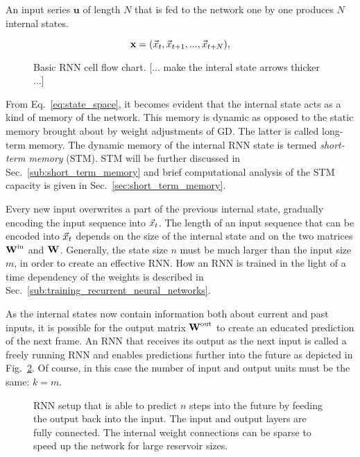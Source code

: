 An input series $\mathbf{u}$ of length $N$ that is fed to the network one by
one produces $N$ internal states.

\begin{equation}
  \mathbf{x} = (\vec{x}_t, \vec{x}_{t+1}, ..., \vec{x}_{t+N}),
\end{equation}
\begin{figure}
  \centering
  \RNNFlowChart
  \caption{Basic RNN cell flow chart. [... make the interal state arrows thicker ...]}
  \label{fig:rnn_flow_chart}
\end{figure}



From Eq.~\ref{eq:state_space}, it becomes evident that the internal state acts
as a kind of memory of the network.  This memory is dynamic as opposed to the
static memory brought about by weight adjustments of GD.  The latter is called
long-term memory. The dynamic memory of the internal RNN state is termed
\emph{short-term memory} (STM). STM will be further discussed in
Sec.~\ref{sub:short_term_memory}  and brief computational analysis of the STM
capacity is given in Sec.~\ref{sec:short_term_memory}. 

Every new input overwrites a part of the previous internal state, gradually
encoding the input sequence into $\vec{x}_t$.  The length of an input sequence
that can be encoded into $\vec{x}_t$ depends on the size of the internal state and
on the two matrices $\boldsymbol{\textbf{W}}^{\text{in}}$ and $\boldsymbol{\textbf{W}}^{\text{}}$.  Generally, the state size $n$
must be much larger than the input size $m$, in order to create an effective
RNN. How an RNN is trained in the light of a time dependency of the weights is
described in Sec.~\ref{sub:training_recurrent_neural_networks}.

As the internal states now contain information both about current and past
inputs, it is possible for the output matrix $\boldsymbol{\textbf{W}}^{\text{out}}$ to create an educated
prediction of the next frame.  An RNN that receives its output as the next
input is called a freely running RNN and enables predictions further into the
future as depicted in Fig.~\ref{fig:annotated_rnn}.  Of course, in this case the
number of input and output units must be the same: $k = m$.

\begin{figure}
  \centering
  \RecurrentNetAnnotated
  \caption{RNN setup that is able to predict $n$ steps into the future by
    feeding the output back into the input. The input and output layers are
    fully connected. The internal weight connections can be sparse to speed
    up the network for large reservoir sizes.
  }
  \label{fig:annotated_rnn}
\end{figure}



